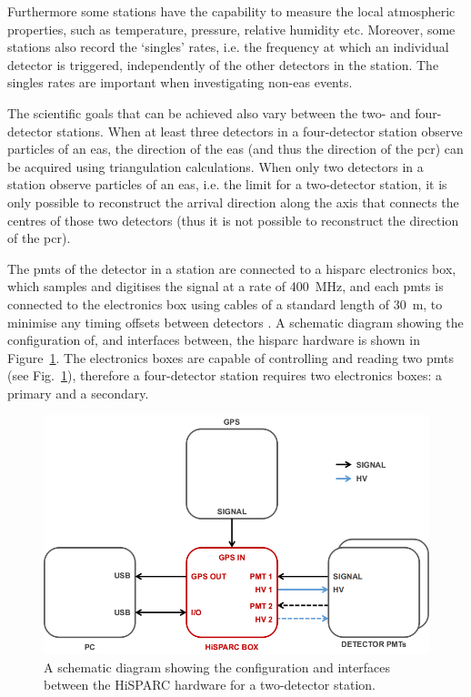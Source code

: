 Furthermore some stations have the capability to measure the local atmospheric properties, such as temperature, pressure, relative humidity etc. Moreover, some stations also record the `singles' rates, i.e. the frequency at which an individual detector is triggered, independently of the other detectors in the station. The singles rates are important when investigating non-\gls{eas} events.

The scientific goals that can be achieved also vary between the two- and four-detector stations. When at least three detectors in a four-detector station observe particles of an \gls{eas}, the direction of the \gls{eas} (and thus the direction of the \gls{pcr}) can be acquired using triangulation calculations. When only two detectors in a station observe particles of an \gls{eas}, i.e. the limit for a two-detector station, it is only possible to reconstruct the arrival direction along the axis that connects the centres of those two detectors (thus it is not possible to reconstruct the direction of the \gls{pcr}).

The \glspl{pmt} of the detector in a station are connected to a \gls{hisparc} electronics box, which samples and digitises the signal at a rate of 400~MHz, and each \glspl{pmt} is connected to the electronics box using cables of a standard length of 30~m, to minimise any timing offsets between detectors \citep{fokkema_hisparc_2012, van_dam_hisparc_2020}. A schematic diagram showing the configuration of, and interfaces between, the \gls{hisparc} hardware is shown in Figure~\ref{fig:HS_hardware_config}. The electronics boxes are capable of controlling and reading two \glspl{pmt} (see Fig.~\ref{fig:HS_hardware_config}), therefore a four-detector station requires two electronics boxes: a primary and a secondary.


\begin{figure}[ht!]
	\centering
	\includegraphics[width=\columnwidth]{HS_hardware_config.png}
	\caption{A schematic diagram showing the configuration and interfaces between the HiSPARC hardware for a two-detector station.}
	\label{fig:HS_hardware_config}
\end{figure}

